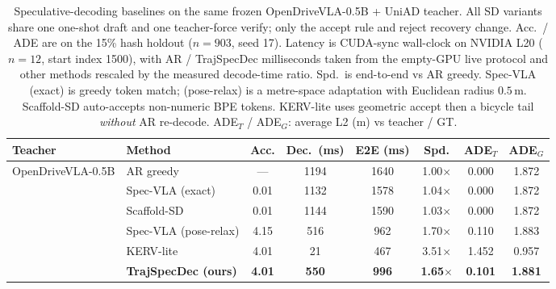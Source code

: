 \begin{table}[t]
\centering
\caption{Speculative-decoding baselines on the same frozen OpenDriveVLA-0.5B + UniAD teacher. All SD variants share one one-shot draft and one teacher-force verify; only the accept rule and reject recovery change. Acc.\ / ADE are on the 15\% hash holdout ($n{=}903$, seed 17). Latency is CUDA-sync wall-clock on NVIDIA L20 ($n{=}12$, start index 1500), with AR / TrajSpecDec milliseconds taken from the empty-GPU live protocol and other methods rescaled by the measured decode-time ratio. Spd.\ is end-to-end vs AR greedy. Spec-VLA (exact) is greedy token match; (pose-relax) is a metre-space adaptation with Euclidean radius $0.5$\,m. Scaffold-SD auto-accepts non-numeric BPE tokens. KERV-lite uses geometric accept then a bicycle tail \emph{without} AR re-decode. ADE$_T$ / ADE$_G$: average L2 (m) vs teacher / GT.}
\label{tab:sd-baselines}
\small
\setlength{\tabcolsep}{3.0pt}
\begin{tabular}{llcccccc}
\toprule
Teacher & Method & Acc. & Dec.\ (ms) & E2E (ms) & Spd. & ADE$_T$ & ADE$_G$ \\
\midrule
OpenDriveVLA-0.5B & AR greedy & --- & 1194 & 1640 & 1.00$\times$ & 0.000 & 1.872 \\
 & Spec-VLA (exact) & 0.01 & 1132 & 1578 & 1.04$\times$ & 0.000 & 1.872 \\
 & Scaffold-SD & 0.01 & 1144 & 1590 & 1.03$\times$ & 0.000 & 1.872 \\
 & Spec-VLA (pose-relax) & 4.15 & 516 & 962 & 1.70$\times$ & 0.110 & 1.883 \\
 & KERV-lite & 4.01 & 21 & 467 & 3.51$\times$ & 1.452 & 0.957 \\
 & \textbf{TrajSpecDec (ours)} & \textbf{4.01} & \textbf{550} & \textbf{996} & \textbf{1.65$\times$} & \textbf{0.101} & \textbf{1.881} \\
\bottomrule
\end{tabular}
\end{table}
